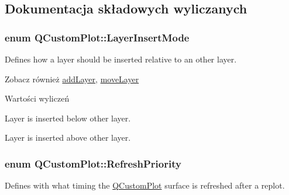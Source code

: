 \subsection{Dokumentacja składowych wyliczanych}
\subsubsection[{\texorpdfstring{Layer\+Insert\+Mode}{LayerInsertMode}}]{\setlength{\rightskip}{0pt plus 5cm}enum {\bf Q\+Custom\+Plot\+::\+Layer\+Insert\+Mode}}\hypertarget{class_q_custom_plot_a75a8afbe6ef333b1f3d47abb25b9add7}{}\label{class_q_custom_plot_a75a8afbe6ef333b1f3d47abb25b9add7}
Defines how a layer should be inserted relative to an other layer.

\begin{DoxySeeAlso}{Zobacz również}
\hyperlink{class_q_custom_plot_ad5255393df078448bb6ac83fa5db5f52}{add\+Layer}, \hyperlink{class_q_custom_plot_ae896140beff19424e9e9e02d6e331104}{move\+Layer} 
\end{DoxySeeAlso}
\begin{Desc}
\item[Wartości wyliczeń]\par
\begin{description}
\item[{\em 
lim\+Below\hypertarget{class_q_custom_plot_a75a8afbe6ef333b1f3d47abb25b9add7aee39cf650cd24e68552da0b697ce4a93}{}\label{class_q_custom_plot_a75a8afbe6ef333b1f3d47abb25b9add7aee39cf650cd24e68552da0b697ce4a93}
}]Layer is inserted below other layer. \item[{\em 
lim\+Above\hypertarget{class_q_custom_plot_a75a8afbe6ef333b1f3d47abb25b9add7a062b0b7825650b432a713c0df6742d41}{}\label{class_q_custom_plot_a75a8afbe6ef333b1f3d47abb25b9add7a062b0b7825650b432a713c0df6742d41}
}]Layer is inserted above other layer. \end{description}
\end{Desc}
\subsubsection[{\texorpdfstring{Refresh\+Priority}{RefreshPriority}}]{\setlength{\rightskip}{0pt plus 5cm}enum {\bf Q\+Custom\+Plot\+::\+Refresh\+Priority}}\hypertarget{class_q_custom_plot_a45d61392d13042e712a956d27762aa39}{}\label{class_q_custom_plot_a45d61392d13042e712a956d27762aa39}
Defines with what timing the \hyperlink{class_q_custom_plot}{Q\+Custom\+Plot} surface is refreshed after a replot.

